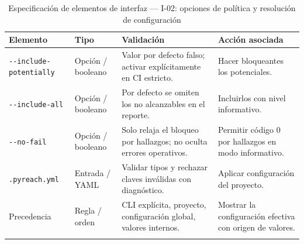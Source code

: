 \begin{table}[H]
\centering\small{}
\caption{Especificación de elementos de interfaz --- I-02: opciones de política y resolución de configuración}
\begin{tabularx}{\textwidth}{P{3.0cm}P{2.3cm}YY}
\toprule
\textbf{Elemento} & \textbf{Tipo} & \textbf{Validación} & \textbf{Acción asociada} \\
\midrule
\texttt{-\allowbreak -\allowbreak include-\allowbreak potentially} & Opción / booleano & Valor por defecto falso; activar explícitamente en CI estricto. & Hacer bloqueantes los potenciales. \\
\addlinespace
\texttt{-\allowbreak -\allowbreak include-\allowbreak all} & Opción / booleano & Por defecto se omiten los no alcanzables en el reporte. & Incluirlos con nivel informativo. \\
\addlinespace
\texttt{-\allowbreak -\allowbreak no-\allowbreak fail} & Opción / booleano & Solo relaja el bloqueo por hallazgos; no oculta errores operativos. & Permitir código 0 por hallazgos en modo informativo. \\
\addlinespace
\texttt{.\allowbreak pyreach.\allowbreak yml} & Entrada / YAML & Validar tipos y rechazar claves inválidas con diagnóstico. & Aplicar configuración del proyecto. \\
\addlinespace
Precedencia & Regla / orden & CLI explícita, proyecto, configuración global, valores internos. & Mostrar la configuración efectiva con origen de valores. \\
\addlinespace
\bottomrule
\end{tabularx}
\end{table}


